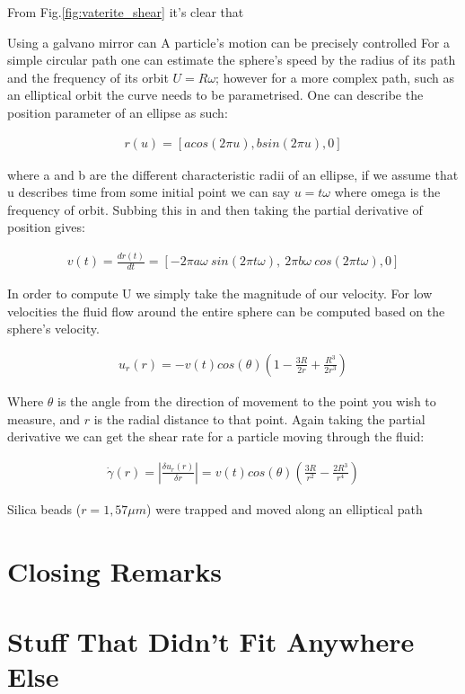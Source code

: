 \documentclass[a4paper,oneside,11pt]{book}
\begin{document}
From Fig.\ref{fig:vaterite_shear} it's clear that 

Using a galvano mirror can A particle's motion can be precisely controlled For a simple circular path one can estimate the sphere's speed by the radius of its path and the frequency of its orbit $U = R\omega$; however for a more complex path, such as an elliptical orbit the curve needs to be parametrised. One can describe the position parameter of an ellipse as such:

\begin{align}
	r(u) = \left[acos(2\pi u),bsin(2\pi u), 0 \right]
\end{align}

where a and b are the different characteristic radii of an ellipse, if we assume that u describes time from some initial point we can say $u=t\omega$ where omega is the frequency of orbit. Subbing this in and then taking the partial derivative of position gives:

\begin{align}
	v(t) = \frac{dr(t)}{dt} = \left[-2\pi a\omega \ sin(2\pi t\omega),\ 2\pi b\omega \ cos(2\pi t\omega),0 \right]
\end{align}

In order to compute U we simply take the magnitude of our velocity. For low velocities the fluid flow around the entire sphere can be computed based on the sphere's velocity.

\begin{align}
	u_r(r)=-v(t)cos(\theta)\left(1-\frac{3R}{2r}+\frac{R^3}{2r^3}\right)
\end{align}

Where $\theta$ is the angle from the direction of movement to the point you wish to measure, and $r$ is the radial distance to that point. Again taking the partial derivative we can get the shear rate for a particle moving through the fluid:

\begin{align}
	\dot{\gamma}(r) = \left| \frac{\delta u_r(r)}{\delta r}\right| = v(t)cos(\theta)\left(\frac{3R}{r^2} -\frac{2R^3}{r^4} \right)
\end{align}

Silica beads ($r=1,57 \mu m$) were trapped and moved along an elliptical path

\chapter{Closing Remarks}



\appendix
\chapter{Stuff That Didn't Fit Anywhere Else}



\end{document}
